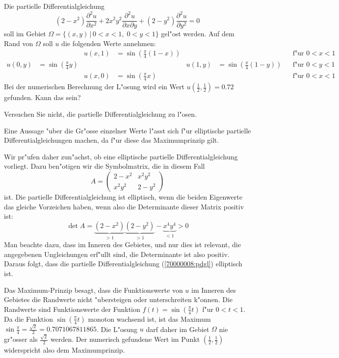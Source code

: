 Die partielle Differentialgleichung
\begin{equation}
(2-x^2)\frac{\partial^2 u}{\partial x^2}
+
2x^2y^2\frac{\partial^2 u}{\partial x\partial y}
+
(2-y^2)\frac{\partial^2 u}{\partial y^2}
=0
\label{70000008:pdgl}
\end{equation}
soll im Gebiet $\Omega=\{(x,y)\,|\, 0< x<1,\; 0<y<1\}$ gel"ost
werden. Auf dem Rand von $\Omega$ soll $u$ die folgenden Werte
annehmen:
\begin{align*}
&
	&u(x,1)&=\sin({\textstyle\frac\pi4}(1-x))
		&&
			&&\text{f"ur $0<x<1$}\\
u(0,y)&=\sin({\textstyle\frac\pi4}y)
	&&
		&u(1,y)&=\sin({\textstyle\frac\pi4}(1-y))
			&&\text{f"ur $0<y<1$}\\
&
	&u(x,0)&=\sin({\textstyle\frac\pi4} x)
		&&                
			&&\text{f"ur $0<x<1$}
\end{align*}
Bei der numerischen Berechnung der L"osung wird ein Wert
$u(\frac12,\frac12)=0.72$ gefunden. Kann das sein?

\begin{hinweis}
Versuchen Sie nicht, die partielle Differentialgleichung zu l"osen.
\end{hinweis}

\begin{loesung}
Eine Aussage "uber die Gr"osse einzelner Werte l"asst sich f"ur
elliptische partielle Differentialgleichungen machen, da f"ur diese das
Maximumprinzip gilt.

Wir pr"ufen daher zun"achst, ob eine elliptische
partielle Differentialgleichung vorliegt. Dazu ben"otigen wir die
Symbolmatrix, die in diesem Fall 
\[
A=\begin{pmatrix}
2-x^2 &x^2y^2\\
x^2y^2&2-y^2
\end{pmatrix}
\]
ist. Die partielle Differentialgleichung ist elliptisch, wenn die
beiden Eigenwerte das gleiche Vorzeichen haben, wenn also die Determinante
dieser Matrix positiv ist:
\[
\det A=\underbrace{(2-x^2)}_{> 1}\underbrace{(2-y^2)}_{> 1}-\underbrace{x^4y^4}_{< 1}>0
\]
Man beachte dazu, dass im Inneren des Gebietes, und nur dies ist relevant,
die angegebenen Ungleichungen erf"ullt sind, die Determinante ist also
positiv.
Daraus folgt, dass die partielle Differentialgleichung (\ref{70000008:pdgl})
elliptisch ist.

Das Maximum-Prinzip besagt, dass die Funktionswerte von $u$ im Inneren
des Gebietes die Randwerte nicht "ubersteigen oder unterschreiten
k"onnen. Die Randwerte sind Funktionswerte der Funktion $f(t)=\sin(\frac\pi4t)$
f"ur $0<t<1$. Da die Funktion $\sin(\frac\pi4t)$ monoton wachsend ist, ist das
Maximum $\sin\frac\pi4=\frac{\sqrt{2}}2=0.7071067811865$.
Die L"osung $u$ darf daher im Gebiet $\Omega$ nie gr"osser als
$\frac{\sqrt{2}}2$ werden. Der numerisch gefundene Wert im Punkt
$(\frac12,\frac12)$ widerspricht also dem Maximumprinzip.
\end{loesung}

